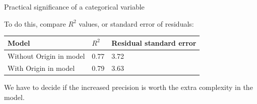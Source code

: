 \documentclass{beamer}\usepackage[]{graphicx}\usepackage[]{color}
\begin{document}
\begin{darkframes}
\begin{frame}{Practical significance of a categorical variable}
        \bigskip\pause
        
        To do this, compare $R^2$ values, or standard error of residuals:

        \bigskip

        \begin{tabular}{lll}
        \textbf{Model} & \textbf{$R^2$} & \textbf{Residual standard error} \\
        \hline
        Without Origin in model & 0.77 & 3.72 \\
        With Origin in model & 0.79 & 3.63 \\
        \hline
        \end{tabular}

        \bigskip

        We have to decide if the increased precision is worth the extra complexity in the model.
      \end{frame}
 
  \end{darkframes}
\end{document}
